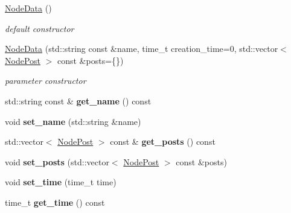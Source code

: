 \begin{DoxyCompactItemize}
\item 
\hypertarget{classfb_1_1_node_data_af784d2cb623aef4b31514fbe37512a5d}{\hyperlink{classfb_1_1_node_data_af784d2cb623aef4b31514fbe37512a5d}{Node\+Data} ()}\label{classfb_1_1_node_data_af784d2cb623aef4b31514fbe37512a5d}

\begin{DoxyCompactList}\small\item\em default constructor \end{DoxyCompactList}\item 
\hyperlink{classfb_1_1_node_data_abe279b5d0d097b73124eba83b9ce0cab}{Node\+Data} (std\+::string const \&name, time\+\_\+t creation\+\_\+time=0, std\+::vector$<$ \hyperlink{structfb_1_1_node_post}{Node\+Post} $>$ const \&posts=\{\})
\begin{DoxyCompactList}\small\item\em parameter constructor \end{DoxyCompactList}\item 
\hypertarget{classfb_1_1_node_data_a4377f6518c8bbd10257dd2bf586d19c2}{std\+::string const \& {\bfseries get\+\_\+name} () const }\label{classfb_1_1_node_data_a4377f6518c8bbd10257dd2bf586d19c2}

\item 
\hypertarget{classfb_1_1_node_data_ab27858fd3d554fc73cf579485e4a6794}{void {\bfseries set\+\_\+name} (std\+::string \&name)}\label{classfb_1_1_node_data_ab27858fd3d554fc73cf579485e4a6794}

\item 
\hypertarget{classfb_1_1_node_data_a3b2687e4867f4c649d9774cf9f41cea1}{std\+::vector$<$ \hyperlink{structfb_1_1_node_post}{Node\+Post} $>$ const \& {\bfseries get\+\_\+posts} () const }\label{classfb_1_1_node_data_a3b2687e4867f4c649d9774cf9f41cea1}

\item 
\hypertarget{classfb_1_1_node_data_a7e0387a3b5f6f28b07b9ba1faf007298}{void {\bfseries set\+\_\+posts} (std\+::vector$<$ \hyperlink{structfb_1_1_node_post}{Node\+Post} $>$ const \&posts)}\label{classfb_1_1_node_data_a7e0387a3b5f6f28b07b9ba1faf007298}

\item 
\hypertarget{classfb_1_1_node_data_ad0b7ee528004047aa1063965b4537820}{void {\bfseries set\+\_\+time} (time\+\_\+t time)}\label{classfb_1_1_node_data_ad0b7ee528004047aa1063965b4537820}

\item 
\hypertarget{classfb_1_1_node_data_a4eb55ccdaa280ac553252419e5118593}{time\+\_\+t {\bfseries get\+\_\+time} () const }\label{classfb_1_1_node_data_a4eb55ccdaa280ac553252419e5118593}

\end{DoxyCompactItemize}

